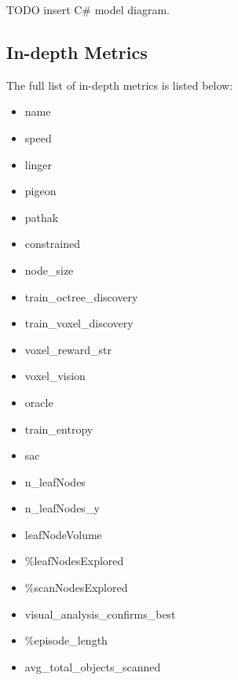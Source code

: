 TODO\: insert C# model diagram.



\subsection{In-depth Metrics}\label{appendix:indepth-metrics}
The full list of in-depth metrics is listed below:
\begin{itemize}
    \item name
    \item speed
    \item linger
    \item pigeon
    \item pathak
    \item constrained
    \item node_size
    \item train_octree_discovery
    \item train_voxel_discovery
    \item voxel_reward_str
    \item voxel_vision
    \item oracle
    \item train_entropy
    \item sac
    \item n_leafNodes
    \item n_leafNodes_y
    \item leafNodeVolume
    \item \%leafNodesExplored
    \item \%scanNodesExplored
    \item visual_analysis_confirms_best
    \item \%episode_length
    \item avg_total_objects_scanned
\end{itemize}

